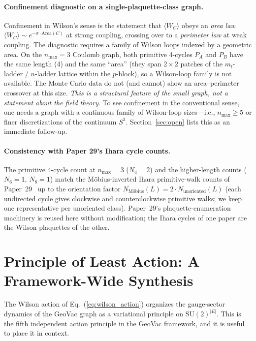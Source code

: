 \documentclass[11pt]{article}
\begin{document}
\paragraph*{Confinement diagnostic on a single-plaquette-class graph.}
Confinement in Wilson's sense is the statement that $\langle W_C
\rangle$ obeys an \emph{area law} $\langle W_C \rangle \sim
e^{-\sigma \cdot \mathrm{Area}(C)}$ at strong coupling, crossing over
to a \emph{perimeter law} at weak coupling.  The diagnostic requires
a family of Wilson loops indexed by a geometric area.  On the
$n_{\max} = 3$ Coulomb graph, both primitive 4-cycles $P_A$ and
$P_B$ have the same length (4) and the same ``area'' (they span
$2 \times 2$ patches of the $m_l$-ladder / $n$-ladder lattice
within the $p$-block), so a Wilson-loop family is not available.
The Monte Carlo data do not (and cannot) show an area--perimeter
crossover at this size.  \emph{This is a structural feature of the
small graph, not a statement about the field theory}.  To see
confinement in the conventional sense, one needs a graph with a
continuous family of Wilson-loop sizes---i.e., $n_{\max} \geq 5$ or
finer discretizations of the continuum $S^3$.  Section~\ref{sec:open}
lists this as an immediate follow-up.

\paragraph*{Consistency with Paper 29's Ihara cycle counts.}  The
primitive 4-cycle count at $n_{\max} = 3$ ($N_4 = 2$) and the
higher-length counts ($N_6 = 1$, $N_8 = 1$) match the M\"obius-inverted
Ihara primitive-walk counts of Paper~29~\cite{paper29} up to the
orientation factor $N_{\text{M\"obius}}(L) = 2 \cdot N_{\text{unoriented}}(L)$
(each undirected cycle gives clockwise and counterclockwise primitive
walks; we keep one representative per unoriented class).  Paper~29's
plaquette-enumeration machinery is reused here without modification;
the Ihara cycles of one paper are the Wilson plaquettes of the other.

\section{Principle of Least Action: A Framework-Wide Synthesis}
\label{sec:action_principles}

The Wilson action of Eq.~(\ref{eq:wilson_action}) organizes the
gauge-sector dynamics of the GeoVac graph as a variational principle
on $\mathrm{SU}(2)^{|E|}$.  This is the fifth independent action
principle in the GeoVac framework, and it is useful to place it in
context.
\end{document}
